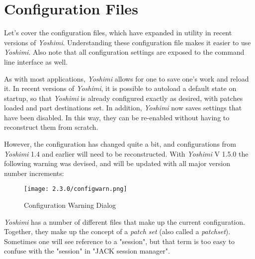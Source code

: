 %
%
%

\section{Configuration Files}
\label{sec:configuration}

   Let's cover the configuration files, which have expanded in utility in
   recent versions of \textsl{Yoshimi}.
   Understanding these configuration file makes it easier to
   use \textsl{Yoshimi}.
   Also note that all configuration settings are exposed to the command line
   interface as well.


   As with most applications, \textsl{Yoshimi} allows for one to save one's
   work and reload it. In recent versions of \textsl{Yoshimi}, it is possible
   to autoload a default state on startup, so that \textsl{Yoshimi} is
   already configured exactly as desired, with patches loaded and part
   destinations set.
   In addition, \textsl{Yoshimi} now saves settings that have been disabled.
   In this way, they can be re-enabled without having to reconstruct them from
   scratch.

   However, the configuration has changed quite a bit, and configurations from
   \textsl{Yoshimi} 1.4 and earlier will need to be reconstructed. With
   \textsl{Yoshimi} V 1.5.0 the following warning was devised, and will be updated
   with all major version number increments:

\begin{figure}[H]
   \centering
   \texttt{[image: 2.3.0/configwarn.png]}
   \caption{Configuration Warning Dialog}
   \label{fig:config_warn_dialog}
\end{figure}

   \textsl{Yoshimi} has a number of different files that make up the current
   configuration.
   Together, they make up the concept of a \textsl{patch set} (also called a
   \textsl{patchset}).
   Sometimes one will see reference to a "session", but that term is too easy
   to confuse with the "session" in "JACK session manager".

